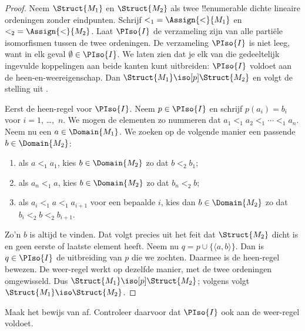 \documentclass[openany]{memoir}
\begin{document}
\begin{proof}
  Neem $\Struct{M_1}$ en $\Struct{M_2}$ als twee !!{enumerable} dichte lineaire
  ordeningen zonder eindpunten. Schrijf ${<_1} = \Assign{<}{M_1}$ en ${<_2} =
  \Assign{<}{M_2}$. Laat $\PIso{I}$ de verzameling zijn van alle partiële
  isomorfismen tussen de twee ordeningen. De verzameling $\PIso{I}$ is niet leeg, want
  in elk geval $\emptyset \in \PIso{I}$. We laten zien dat je elk van die
  gedeeltelijk ingevulde koppelingen aan beide kanten kunt uitbreiden: $\PIso{I}$
  voldoet aan de heen-en-weereigenschap. Dan $\Struct{M_1} \iso[p] \Struct{M_2}$
  en volgt de stelling uit .

  Eerst de heen-regel voor $\PIso{I}$. Neem $p \in
  \PIso{I}$ en schrijf $p(a_i) = b_i$ voor $i = 1$, \dots,~$n$.
  We mogen de elementen zo nummeren dat $a_1 <_1 a_2 <_1 \cdots <_1
  a_n$. Neem nu een $a \in \Domain{M_1}$. We zoeken op de volgende
  manier een passende $b \in \Domain{M_2}$:
  \begin{enumerate}
  \item als $a <_1 a_1$, kies $b \in \Domain{M_2}$ zo dat $b <_2
    b_1$;
  \item als $a_n <_1 a$, kies $b \in \Domain{M_2}$ zo dat $b_n <_2 b$;
 \item als $a_i <_1 a <_1 a_{i+1}$ voor een bepaalde $i$, kies dan $b \in
   \Domain{M_2}$ zo dat $b_i <_2 b <_2 b_{i+1}$.
  \end{enumerate}
  Zo'n $b$ is altijd te vinden. Dat volgt precies uit het feit dat
  $\Struct{M_2}$ dicht is en geen eerste of laatste element heeft. Neem nu
  $q = p \cup \{ \langle a, b \rangle \}$. Dan is $q \in \PIso{I}$ de
  uitbreiding van $p$ die we zochten. Daarmee is de heen-regel bewezen.
  De weer-regel werkt op dezelfde manier, met de twee ordeningen omgewisseld.
  Dus $\Struct{M_1} \iso[p] \Struct{M_2}$; volgens
   volgt $\Struct{M_1} \iso \Struct{M_2}$.
\end{proof}

\begin{prob}
  Maak het bewijs van  af. Controleer
  daarvoor dat $\PIso{I}$ ook aan de weer-regel voldoet.
\end{prob}
\end{document}

